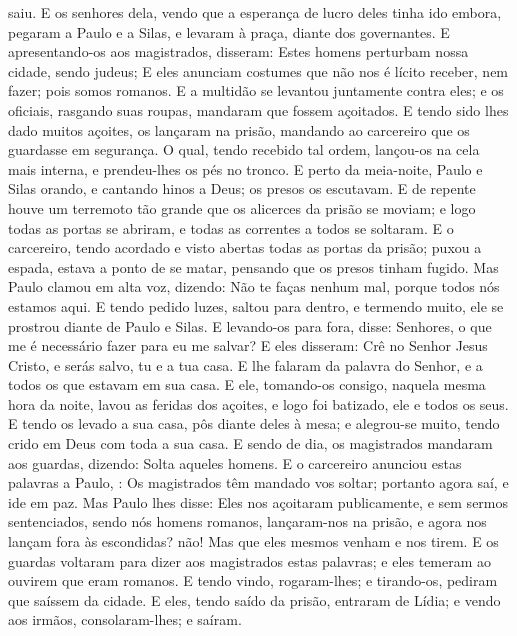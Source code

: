 {{} saiu.
E os senhores dela, vendo que a esperança de lucro deles tinha ido embora, pegaram a Paulo e a Silas, e
{} levaram à praça, diante dos governantes.
E apresentando-os aos magistrados, disseram: Estes homens perturbam nossa cidade, sendo judeus;
E eles anunciam costumes que não nos é lícito receber, nem fazer; pois somos romanos.
E a multidão se levantou juntamente contra eles; e os oficiais, rasgando suas roupas, mandaram que fossem açoitados.
E tendo sido lhes dado muitos açoites, os lançaram na prisão, mandando ao carcereiro que os guardasse em segurança.
O qual, tendo recebido tal ordem, lançou-os na cela mais interna, e prendeu-lhes os pés no tronco.
E perto da meia-noite, Paulo e Silas
{} orando, e cantando hinos a Deus;
{} os
{} presos os escutavam.
E de repente houve um terremoto tão grande que os alicerces da prisão se moviam; e logo todas as portas se abriram, e todas as correntes
{} a todos se soltaram.
E o carcereiro, tendo acordado e visto abertas todas as portas da prisão; puxou a espada,
{} estava a ponto de se matar, pensando que os presos tinham fugido.
Mas Paulo clamou em alta voz, dizendo: Não te faças nenhum mal, porque todos nós estamos aqui.
E tendo pedido luzes, saltou para dentro, e termendo muito, ele se prostrou diante de Paulo e Silas.
E levando-os para fora, disse: Senhores, o que me é necessário fazer para eu me salvar?
E eles
{} disseram: Crê no Senhor Jesus Cristo, e serás salvo, tu e a tua casa.
E lhe falaram da palavra do Senhor, e a todos os que estavam em sua casa.
E ele, tomando-os consigo, naquela mesma hora da noite, lavou
{} as feridas dos açoites, e logo foi batizado, ele e todos os seus.
E tendo os levado a sua casa, pôs
{} diante deles à mesa; e alegrou-se muito, tendo crido em Deus com toda a sua casa.
E sendo
{} de dia, os magistrados mandaram aos guardas, dizendo: Solta aqueles homens.
E o carcereiro anunciou estas palavras a Paulo,
{} : Os magistrados têm mandado vos soltar; portanto agora saí, e ide em paz.
Mas Paulo lhes disse: Eles nos açoitaram publicamente, e sem sermos sentenciados, sendo nós homens romanos, lançaram-nos na prisão, e agora nos lançam fora às escondidas?
{} não! Mas que eles mesmos venham e nos tirem.
E os guardas voltaram para dizer aos magistrados estas palavras; e eles temeram ao ouvirem que eram romanos.
E tendo vindo, rogaram-lhes; e tirando-os, pediram
{} que saíssem da cidade.
E eles, tendo saído da prisão, entraram
{} de Lídia; e vendo aos irmãos, consolaram-lhes; e saíram.

}
